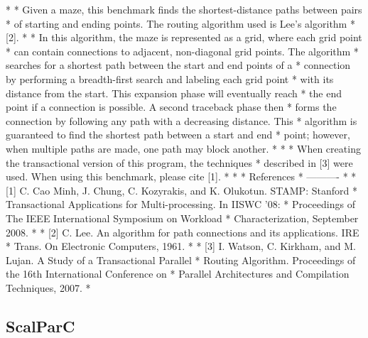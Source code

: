 \documentclass{article}
\begin{document}
*
* Given a maze, this benchmark finds the shortest-distance paths between pairs 
* of starting and ending points. The routing algorithm used is Lee's algorithm 
* [2].
* 
* In this algorithm, the maze is represented as a grid, where each grid point 
* can contain connections to adjacent, non-diagonal grid points. The algorithm
* searches for a shortest path between the start and end points of a 
* connection by performing a breadth-first search and labeling each grid point 
* with its distance from the start. This expansion phase will eventually reach 
* the end point if a connection is possible. A second traceback phase then 
* forms the connection by following any path with a decreasing distance. This 
* algorithm is guaranteed to find the shortest path  between a start and end 
* point; however, when multiple paths are made, one path may block another.
*
*
* When creating the transactional version of this program, the techniques
* described in [3] were used. When using this benchmark, please cite [1].
*
*
* References
* ----------
*
* [1] C. Cao Minh, J. Chung, C. Kozyrakis, and K. Olukotun. STAMP: Stanford 
*     Transactional Applications for Multi-processing. In IISWC '08: 
*     Proceedings of The IEEE International Symposium on Workload 
*     Characterization, September 2008. 
*
* [2] C. Lee. An algorithm for path connections and its applications. IRE 
*     Trans. On Electronic Computers, 1961.
*
* [3] I. Watson, C. Kirkham, and M. Lujan. A Study of a Transactional Parallel
*     Routing Algorithm. Proceedings of the 16th International Conference on
*     Parallel Architectures and Compilation Techniques, 2007.
*

\subsection{ScalParC}


\end{document}

